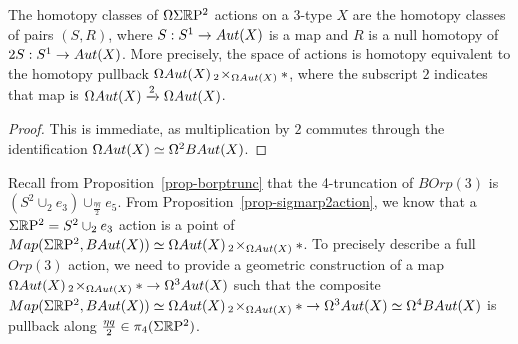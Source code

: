 \documentclass{amsart}
\begin{document}
\begin{prop} 
\label{prop-sigmarp2action}
The homotopy classes of $\Omega \Sigma \mathbb R \mathrm{P}^2$ actions on a 3-type $X$ are the homotopy classes of pairs $(S,R)$, where $S: S^1 \rightarrow Aut(X)$ is a map and $R$ is a null homotopy of $2S: S^1 \rightarrow Aut(X)$.  More precisely, the space of actions is homotopy equivalent to the homotopy pullback $\Omega Aut(X) \,_2\!\times_{\Omega Aut(X)} \ast$, where the subscript $2$ indicates that map is $\Omega Aut(X) \xrightarrow{2} \Omega Aut(X)$.
\end{prop}
\begin{proof}
This is immediate, as multiplication by $2$ commutes through the identification $\Omega Aut(X) \simeq \Omega^2 BAut(X)$.
\end{proof}

Recall from Proposition~\ref{prop-borptrunc} that the 4-truncation of $BOrp(3)$ is $(S^2 \cup_2 e_3) \cup_{\frac{\eta q}{2}} e_5$.  From Proposition~\ref{prop-sigmarp2action}, we know that a $\Sigma \mathbb R \mathrm{P}^2 = S^2 \cup_2 e_3$ action is a point of $Map(\Sigma \mathbb R \mathrm{P}^2,BAut(X)) \simeq \Omega Aut(X) \,_2\! \times_{\Omega Aut(X)} \ast$.  To precisely describe a full $Orp(3)$ action, we need to provide a geometric construction of a map $\Omega Aut(X) \,_2\! \times_{\Omega Aut(X)} \ast \rightarrow \Omega^3 Aut(X)$ such that the composite $Map(\Sigma \mathbb R \mathrm{P}^2,BAut(X)) \simeq \Omega Aut(X) \,_2\! \times_{\Omega Aut(X)} \ast \rightarrow \Omega^3 Aut(X) \simeq \Omega^4 BAut(X)$ is pullback along $\frac{\eta q}{2} \in \pi_4(\Sigma\mathbb R \mathrm{P}^2)$.  
\end{document}
